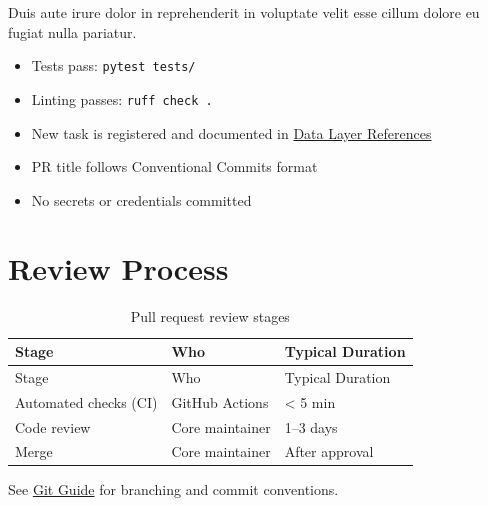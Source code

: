 \documentclass[
  letterpaper,
  DIV=11,
  numbers=noendperiod]{scrreprt}
\providecommand{\tightlist}{%
  \setlength{\itemsep}{0pt}\setlength{\parskip}{0pt}}
\begin{document}
Duis aute irure dolor in reprehenderit in voluptate velit esse cillum
dolore eu fugiat nulla pariatur.

\begin{itemize}
\tightlist
\item[$\square$]
  Tests pass: \texttt{pytest\ tests/}
\item[$\square$]
  Linting passes: \texttt{ruff\ check\ .}
\item[$\square$]
  New task is registered and documented in
  \hyperref[data-layer-references]{Data Layer References}
\item[$\square$]
  PR title follows Conventional Commits format
\item[$\square$]
  No secrets or credentials committed
\end{itemize}

\section{Review Process}\label{review-process}

\begin{longtable}[]{@{}lll@{}}
\caption{Pull request review stages}\label{tbl-review}\tabularnewline
\toprule\noalign{}
Stage & Who & Typical Duration \\
\midrule\noalign{}
\endfirsthead
\toprule\noalign{}
Stage & Who & Typical Duration \\
\midrule\noalign{}
\endhead
\bottomrule\noalign{}
\endlastfoot
Automated checks (CI) & GitHub Actions & \textless{} 5 min \\
Code review & Core maintainer & 1--3 days \\
Merge & Core maintainer & After approval \\
\end{longtable}

\begin{tcolorbox}[enhanced jigsaw, arc=.35mm, bottomrule=.15mm, bottomtitle=1mm, breakable, colback=white, colbacktitle=quarto-callout-note-color!10!white, colframe=quarto-callout-note-color-frame, coltitle=black, left=2mm, leftrule=.75mm, opacityback=0, opacitybacktitle=0.6, rightrule=.15mm, title=\textcolor{quarto-callout-note-color}{\faInfo}\hspace{0.5em}{Note}, titlerule=0mm, toprule=.15mm, toptitle=1mm]

See \hyperref[git-guide]{Git Guide} for branching and commit
conventions.

\end{tcolorbox}
\end{document}
